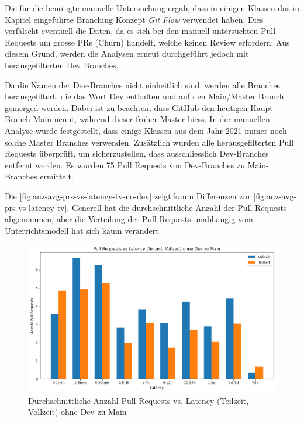 Die für die  benötigte manuelle Untersuchung ergab, dass in einigen Klassen das in Kapitel  eingeführte Branching Konzept \textit{Git Flow} verwendet haben. Dies verfälscht eventuell die Daten, da es sich bei den manuell untersuchten Pull Requests um grosse PRs (Churn) handelt, welche keinen Review erfordern. Aus diesem Grund, werden die Analysen erneut durchgeführt jedoch mit herausgefilterten Dev Branches.

Da die Namen der Dev-Branches nicht einheitlich sind, werden alle Branches herausgefiltert, die das Wort Dev enthalten und auf den Main/Master Branch gemerged werden. Dabei ist zu beachten, dass GitHub den heutigen Haupt-Branch Main nennt, während dieser früher Master hiess. In der manuellen Analyse wurde festgestellt, dass einige Klassen aus dem Jahr 2021 immer noch solche Master Branches verwenden. Zusätzlich wurden alle herausgefilterten Pull Requests überprüft, um sicherzustellen, dass ausschliesslich Dev-Branches entfernt werden. Es wurden 75 Pull Requests von Dev-Branches zu Main-Branches ermittelt.

Die \autoref{fig:anz-avg-prs-vs-latency-tv-no-dev} zeigt kaum Differenzen zur \autoref{fig:anz-avg-prs-vs-latency-tv}. Generell hat die durchschnittliche Anzahl der Pull Requests abgenommen, aber die Verteilung der Pull Requests unabhängig vom Unterrichtsmodell hat sich kaum verändert. 

\begin{figure}[htbp]
    \includegraphics[width=\textwidth]{Figures/anz-avg-prs-vs-latency-tv-no-dev.png}
    \caption{Durchschnittliche Anzahl Pull Requests vs. Latency (Teilzeit, Vollzeit) ohne Dev zu Main}
    \label{fig:anz-avg-prs-vs-latency-tv-no-dev}
\end{figure}
\newpage

